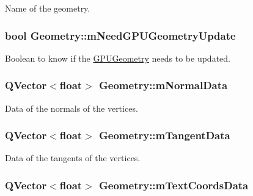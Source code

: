 Name of the geometry. 

\hypertarget{class_geometry_a44193e1c6e4d8678c0e466a1688a1d1b}{
\subsubsection[{m\+Need\+G\+P\+U\+Geometry\+Update}]{\setlength{\rightskip}{0pt plus 5cm}bool Geometry\+::m\+Need\+G\+P\+U\+Geometry\+Update\hspace{0.3cm}{\ttfamily [private]}}}\label{class_geometry_a44193e1c6e4d8678c0e466a1688a1d1b}


Boolean to know if the \hyperlink{class_g_p_u_geometry}{G\+P\+U\+Geometry} needs to be updated. 

\hypertarget{class_geometry_aeb01f8834836e53482da4116bdcb7b42}{
\subsubsection[{m\+Normal\+Data}]{\setlength{\rightskip}{0pt plus 5cm}Q\+Vector$<$float$>$ Geometry\+::m\+Normal\+Data\hspace{0.3cm}{\ttfamily [private]}}}\label{class_geometry_aeb01f8834836e53482da4116bdcb7b42}


Data of the normals of the vertices. 

\hypertarget{class_geometry_a7c1d990e17927df0bba609636ae646a2}{
\subsubsection[{m\+Tangent\+Data}]{\setlength{\rightskip}{0pt plus 5cm}Q\+Vector$<$float$>$ Geometry\+::m\+Tangent\+Data\hspace{0.3cm}{\ttfamily [private]}}}\label{class_geometry_a7c1d990e17927df0bba609636ae646a2}


Data of the tangents of the vertices. 

\hypertarget{class_geometry_afd1dd852a551a6e2c4ea6fad41aceb68}{
\subsubsection[{m\+Text\+Coords\+Data}]{\setlength{\rightskip}{0pt plus 5cm}Q\+Vector$<$float$>$ Geometry\+::m\+Text\+Coords\+Data\hspace{0.3cm}{\ttfamily [private]}}}\label{class_geometry_afd1dd852a551a6e2c4ea6fad41aceb68}


